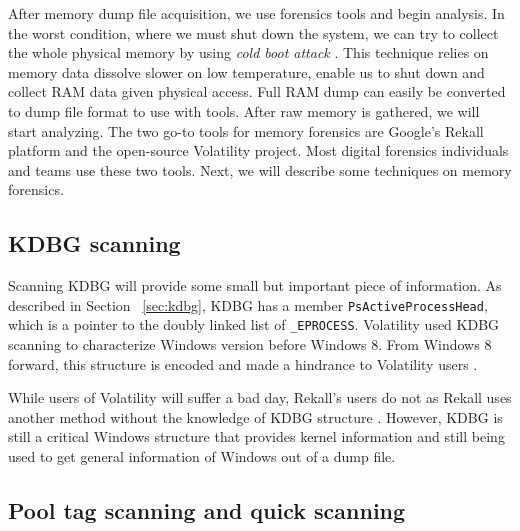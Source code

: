 After memory dump file acquisition, we use forensics tools and begin analysis. In the worst condition, where we must shut down the system, we can try to collect the whole physical memory by using \textit{cold boot attack} \cite{coldboot}. This technique relies on memory data dissolve slower on low temperature, enable us to shut down and collect RAM data given physical access. Full RAM dump can easily be converted to dump file format to use with tools. After raw memory is gathered, we will start analyzing. The two go-to tools for memory forensics are Google's Rekall platform and the open-source Volatility project. Most digital forensics individuals and teams use these two tools. Next, we will describe some techniques on memory forensics.

\subsection[KDBG scanning]{KDBG scanning}

Scanning KDBG will provide some small but important piece of information. As described in Section ~\ref{sec:kdbg}, KDBG has a member \texttt{PsActiveProcessHead}, which is a pointer to the doubly linked list of \texttt{\_EPROCESS}. Volatility used KDBG scanning to characterize Windows version before Windows 8. From Windows 8 forward, this structure is encoded and made a hindrance to Volatility users \cite{kdbgEncoded}.


While users of Volatility will suffer a bad day, Rekall's users do not as Rekall uses another method without the knowledge of KDBG structure \cite{rekallOnKDBGEncoding}. However, KDBG is still a critical Windows structure that provides kernel information and still being used to get general information of Windows out of a dump file.

\subsection[Pool tag scanning and quick scanning]{Pool tag scanning and quick scanning}
\label{sec:pooltagscanning}

